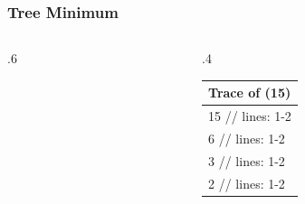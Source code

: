 \documentclass[10pt]{beamer}
\begin{document}
\begin{frame}[t]\frametitle{Tree Minimum}
	\begin{columns}[T] %
	\begin{column}{.6\linewidth} %
		{\footnotesize
				
		} %

		\vspace{3cm}	
		{\footnotesize 
			\\
			\\
		} %
		
	\end{column} %
	\begin{column}{.4\linewidth} %

		{\small 
		
		} %

		{\footnotesize 
			\begin{tabular}{| l |}
			\hline
			Trace of {\scriptsize \TreeMinimum(15)}\\
			\hline
			15 // lines: 1-2\\
			6 // lines: 1-2\\
			3 // lines: 1-2\\
			2 // lines: 1-2\\
			\hline
			\end{tabular}
		} %

	\end{column} %
	\end{columns} %
	
\end{frame}
\end{document}
